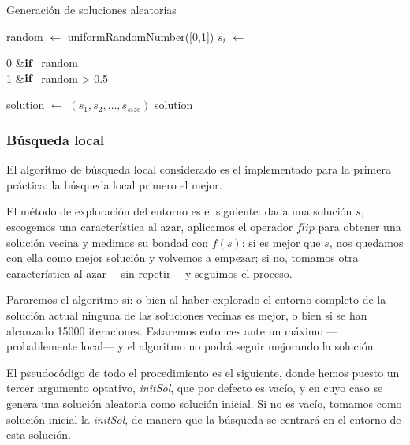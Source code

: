 \documentclass[a4paper, 11pt, titlepage]{article}
\begin{document}
    \begin{algorithm}
        \caption{Generación de soluciones aleatorias}\label{randomSol}
        \begin{algorithmic}[1]
                \State random $\gets$ uniformRandomNumber([0,1])
                \State $s_i$ $\gets$ \begin{cases}
                    0 &$\textrm{\textbf{if} }$ random  \\
                    1 &$\textrm{\textbf{if} }$ random  > 0.5
                \end{cases}
            \EndFor
            \State solution $\gets$ $(s_1, s_2, \dots, s_{size})$
            \State \Return solution
        \end{algorithmic}
    \end{algorithm}


    \subsubsection*{Búsqueda local}
    El algoritmo de búsqueda local considerado es el implementado para la primera práctica: la búsqueda local primero el mejor.

    El método de exploración del entorno es el siguiente: dada una solución $s$, escogemos una característica al azar, aplicamos el operador $flip$ para obtener una solución vecina y medimos su bondad con $f(s)$; si es mejor que $s$, nos quedamos con ella como mejor solución y volvemos a empezar; si no, tomamos otra característica al azar ---sin repetir--- y seguimos el proceso.

    Pararemos el algoritmo si: o bien al haber explorado el entorno completo de la solución actual ninguna de las soluciones vecinas es mejor, o bien si se han alcanzado 15000 iteraciones. Estaremos entonces ante un máximo ---probablemente local--- y el algoritmo no podrá seguir mejorando la solución.

    El pseudocódigo de todo el procedimiento es el siguiente, donde hemos puesto un tercer argumento optativo, \emph{initSol}, que por defecto es vacío, y en cuyo caso se genera una solución aleatoria como solución inicial. Si no es vacío, tomamos como solución inicial la \emph{initSol}, de manera que la búsqueda se centrará en el entorno de esta solución.
\end{document}
